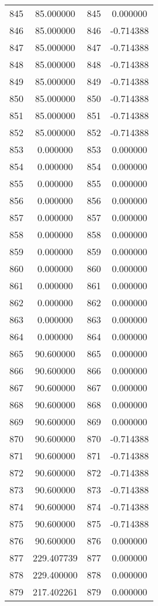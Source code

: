 \documentclass[12pt]{article}
\begin{document}
\begin{longtable}{@{}cccc@{}}
845 & 85.000000 & 845 & 0.000000 \\
846 & 85.000000 & 846 & -0.714388 \\
847 & 85.000000 & 847 & -0.714388 \\
848 & 85.000000 & 848 & -0.714388 \\
849 & 85.000000 & 849 & -0.714388 \\
850 & 85.000000 & 850 & -0.714388 \\
851 & 85.000000 & 851 & -0.714388 \\
852 & 85.000000 & 852 & -0.714388 \\
853 & 0.000000 & 853 & 0.000000 \\
854 & 0.000000 & 854 & 0.000000 \\
855 & 0.000000 & 855 & 0.000000 \\
856 & 0.000000 & 856 & 0.000000 \\
857 & 0.000000 & 857 & 0.000000 \\
858 & 0.000000 & 858 & 0.000000 \\
859 & 0.000000 & 859 & 0.000000 \\
860 & 0.000000 & 860 & 0.000000 \\
861 & 0.000000 & 861 & 0.000000 \\
862 & 0.000000 & 862 & 0.000000 \\
863 & 0.000000 & 863 & 0.000000 \\
864 & 0.000000 & 864 & 0.000000 \\
865 & 90.600000 & 865 & 0.000000 \\
866 & 90.600000 & 866 & 0.000000 \\
867 & 90.600000 & 867 & 0.000000 \\
868 & 90.600000 & 868 & 0.000000 \\
869 & 90.600000 & 869 & 0.000000 \\
870 & 90.600000 & 870 & -0.714388 \\
871 & 90.600000 & 871 & -0.714388 \\
872 & 90.600000 & 872 & -0.714388 \\
873 & 90.600000 & 873 & -0.714388 \\
874 & 90.600000 & 874 & -0.714388 \\
875 & 90.600000 & 875 & -0.714388 \\
876 & 90.600000 & 876 & 0.000000 \\
877 & 229.407739 & 877 & 0.000000 \\
878 & 229.400000 & 878 & 0.000000 \\
879 & 217.402261 & 879 & 0.000000 \\

\end{longtable}
\end{document}
